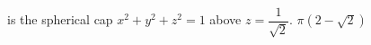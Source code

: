 {\surfaceS\ is the spherical cap $x^2 + y^2 + z^2 = 1$ above $z = \dfrac{1}{\sqrt{2}}$.
}
{$\pi \left( 2 - \sqrt{2} \right)$}
